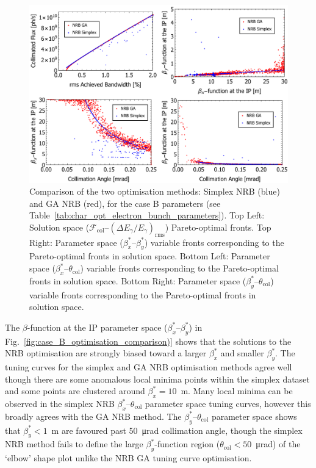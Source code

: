 \documentclass[../main.tex]{subfiles}
\begin{document}
\begin{figure}[!h]
\centering
\includegraphics[width=\textwidth]{Figures/Optimisation_and_Characterisation_of_Inverse_Compton_Scattering_Sources/CaseBoptcomp.pdf}
\caption{Comparison of the two optimisation methods: Simplex NRB (blue) and GA NRB (red), for the case B parameters (see Table~\ref{tab:char_opt_electron_bunch_parameters}). Top Left: Solution space ($\mathcal{F}_{\mathrm{col}}$--$\left(\Delta E_{\gamma}/E_{\gamma}\right)_{\mathrm{rms}}$) Pareto-optimal fronts. Top Right: Parameter space ($\beta_{x}^{*}$--$\beta_{y}^{*}$) variable fronts corresponding to the Pareto-optimal fronts in solution space. Bottom Left: Parameter space ($\beta_{x}^{*}$--$\theta_{\mathrm{col}}$) variable fronts corresponding to the Pareto-optimal fronts in solution space. Bottom Right: Parameter space ($\beta_{y}^{*}$--$\theta_{\mathrm{col}}$) variable fronts corresponding to the Pareto-optimal fronts in solution space.}
\label{fig:case_B_optimisation_comparison}
\end{figure}

The $\beta$-function at the IP parameter space ($\beta_{x}^{*}$--$\beta_{y}^{*}$) in Fig.~\ref{fig:case_B_optimisation_comparison)} shows that the solutions to the NRB optimisation are strongly biased toward a larger $\beta_{x}^{*}$ and smaller $\beta_{y}^{*}$. The tuning curves for the simplex and GA NRB optimisation methods agree well though there are some anomalous local minima points within the simplex dataset and some points are clustered around $\beta_{x}^{*} = 10$~\si{\meter}. Many local minima can be observed in the simplex NRB $\beta_{x}^{*}$--$\theta_{\mathrm{col}}$ parameter space tuning curves, however this broadly agrees with the GA NRB method. The $\beta_{y}^{*}$--$\theta_{\mathrm{col}}$ parameter space shows that $\beta_{y}^{*} < 1$~\si{\meter} are favoured past 50~\si{\micro\radian} collimation angle, though the simplex NRB method fails to define the large $\beta_{y}^{*}$-function region ($\theta_{\mathrm{col}} < 50$~\si{\micro\radian}) of the `elbow' shape plot unlike the NRB GA tuning curve optimisation. 
\end{document}
